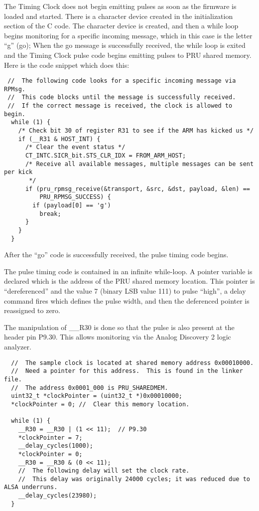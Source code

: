 The Timing Clock does not begin emitting pulses as soon as the firmware is loaded and started.  There is a character device created in the initialization section of the C code.  The character device is created, and then a while loop begins monitoring for a specific incoming message, which in this case is the letter ``g'' (go);  When the go message is successfully received, the while loop is exited and the Timing Clock pulse code begins emitting pulses to PRU shared memory.  Here is the code snippet which does this:

\begin{verbatim}
 //  The following code looks for a specific incoming message via RPMsg.
 //  This code blocks until the message is successfully received.
 //  If the correct message is received, the clock is allowed to begin.
  while (1) {
    /* Check bit 30 of register R31 to see if the ARM has kicked us */
    if (__R31 & HOST_INT) {
      /* Clear the event status */
      CT_INTC.SICR_bit.STS_CLR_IDX = FROM_ARM_HOST;
      /* Receive all available messages, multiple messages can be sent per kick
       */
      if (pru_rpmsg_receive(&transport, &src, &dst, payload, &len) ==
          PRU_RPMSG_SUCCESS) {
        if (payload[0] == 'g')
          break;
      }
    }
  }
\end{verbatim}

After the ``go'' code is successfully received, the pulse timing code begins.

The pulse timing code is contained in an infinite while-loop.  A pointer variable is declared which is the address of the PRU shared memory location.  This pointer is ``dereferenced'' and the value 7 (binary LSB value 111) to pulse ``high'', a delay command fires which defines the pulse width, and then the deferenced pointer is reassigned to zero.

The manipulation of \_\_R30 is done so that the pulse is also present at the header pin P9.30.  This allows monitoring via the Analog Discovery 2 logic analyzer.

\begin{verbatim}
  //  The sample clock is located at shared memory address 0x00010000.
  //  Need a pointer for this address.  This is found in the linker file.
  //  The address 0x0001_000 is PRU_SHAREDMEM.
  uint32_t *clockPointer = (uint32_t *)0x00010000;
  *clockPointer = 0; //  Clear this memory location.

  while (1) {
    __R30 = __R30 | (1 << 11);  // P9.30
    *clockPointer = 7;
    __delay_cycles(1000); 
    *clockPointer = 0;
    __R30 = __R30 & (0 << 11);
    //  The following delay will set the clock rate.
    //  This delay was originally 24000 cycles; it was reduced due to ALSA underruns.
    __delay_cycles(23980); 
  }
\end{verbatim}

